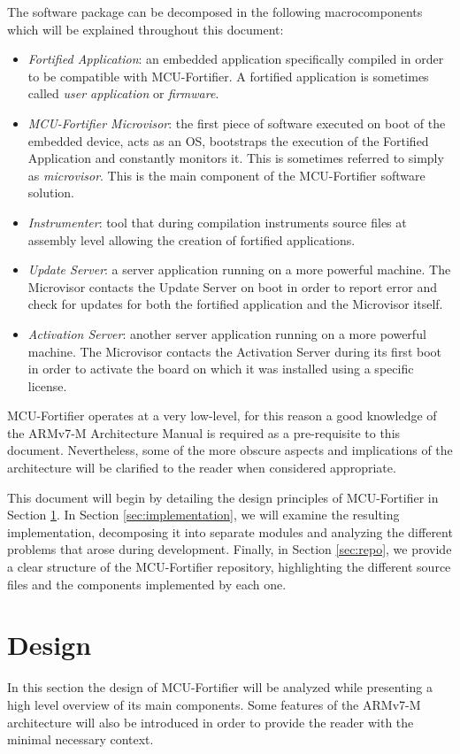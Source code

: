 \documentclass{article}
\begin{document}
The software package can be decomposed in the following macrocomponents which will be explained throughout this document:
\begin{itemize}
	\item \textit{Fortified Application}: an embedded application specifically compiled in order to be compatible with MCU-Fortifier. A fortified application is sometimes called \textit{user application} or \textit{firmware}.
	\item \textit{MCU-Fortifier Microvisor}: the first piece of software executed on boot of the embedded device, acts as an OS, bootstraps the execution of the Fortified Application and constantly monitors it. This is sometimes referred to simply as \textit{microvisor}. This is the main component of the MCU-Fortifier software solution.
	\item \textit{Instrumenter}: tool that during compilation instruments source files at assembly level allowing the creation of fortified applications.
	\item \textit{Update Server}: a server application running on a more powerful machine. The Microvisor contacts the Update Server on boot in order to report error and check for updates for both the fortified application and the Microvisor itself.
	\item \textit{Activation Server}: another server application running on a more powerful machine. The Microvisor contacts the Activation Server during its first boot in order to activate the board on which it was installed using a specific license.
\end{itemize}

MCU-Fortifier operates at a very low-level, for this reason a good knowledge of the ARMv7-M Architecture Manual\cite{armv7m} is required as a pre-requisite to this document. Nevertheless, some of the more obscure aspects and implications of the architecture will be clarified to the reader when considered appropriate.

This document will begin by detailing the design principles of MCU-Fortifier in Section \ref{sec:design}. In Section \ref{sec:implementation}, we will examine the resulting implementation, decomposing it into separate modules and analyzing the different problems that arose during development. Finally, in Section \ref{sec:repo}, we provide a clear structure of the MCU-Fortifier repository, highlighting the different source files and the components implemented by each one.


\newpage
\section{Design}
\label{sec:design}
In this section the design of MCU-Fortifier will be analyzed while presenting a high level overview of its main components. Some features of the ARMv7-M architecture will also be introduced in order to provide the reader with the minimal necessary context.
\end{document}
